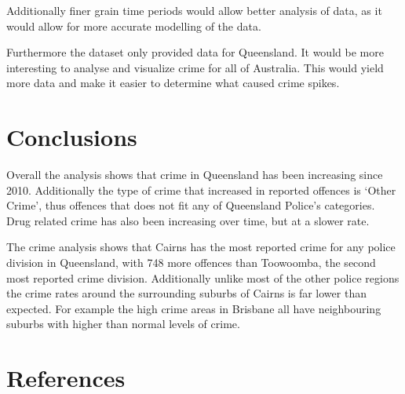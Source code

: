 \documentclass[]{article}
\begin{document}
Additionally finer grain time periods would allow better analysis of data, as it would allow for more
accurate modelling of the data.

Furthermore the dataset only provided data for Queensland.
It would be more interesting to analyse and visualize crime for all of Australia.
This would yield more data and make it easier to determine what caused crime spikes.

\section{Conclusions}

Overall the analysis shows that crime in Queensland has been increasing since 2010.
Additionally the type of crime that increased in reported offences is `Other Crime', thus offences that does not fit any of Queensland Police's categories.
Drug related crime has also been increasing over time, but at a slower rate.

The crime analysis shows that Cairns has the most reported crime for any police division in Queensland, with 748 more offences than Toowoomba, the second most reported crime division.
Additionally unlike most of the other police regions the crime rates around the surrounding suburbs of Cairns is far lower than expected.
For example the high crime areas in Brisbane all have neighbouring suburbs with higher than normal levels of crime.

\section{References}



\end{document}
